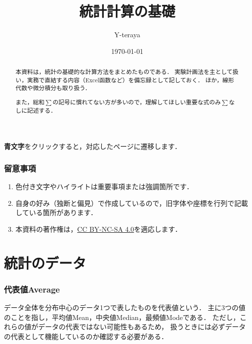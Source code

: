 \documentclass[a4paper,11pt]{ltjsarticle}
\title{\textbf{統計計算の基礎}}
\author{Y-teraya}
\date{\today}
\begin{document}
\maketitle

\begin{abstract}
  本資料は，統計の基礎的な計算方法をまとめたものである．
  実験計画法を主として扱い，実務で直結する内容（Excel函数など）を備忘録として記しておく．
  ほか，線形代数や微分積分も取り扱う．

  また，総和$\displaystyle{\sum}$の記号に慣れてない方が多いので，理解してほしい重要な式のみ$\displaystyle{\sum}$なしに記述する．
\end{abstract}

\tableofcontents

\vspace{12pt}

\begin{center}
  \textbf{\color{blue}青文字}をクリックすると，対応したページに遷移します．
\end{center}

\clearpage

\section*{留意事項}

\begin{enumerate}
  \item 色付き文字やハイライトは重要事項または強調箇所です．
  \item 自身の好み（独断と偏見）で作成しているので，旧字体や座標を行列で記載している箇所があります．
  \item 本資料の著作権は，\href{https://creativecommons.org/licenses/by-nc-sa/4.0}{CC BY-NC-SA 4.0}を適応します．
\end{enumerate}

\clearpage

\part{統計のデータ}
\label{part: statistics}

\section{代表値Average}
\label{sec: average}

データ全体を分布中心のデータ1つで表したものを代表値という．
主に3つの値のことを指し，平均値Mean，中央値Median，最頻値Modeである．
ただし，これらの値がデータの代表ではない可能性もあるため，
扱うときには必ずデータの代表として機能しているのか確認する必要がある．
\end{document}
